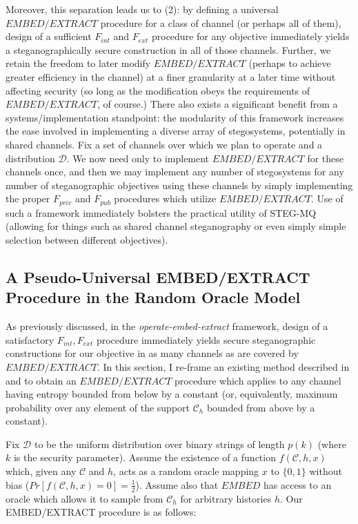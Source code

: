 \documentclass{article}
\begin{document}
Moreover, this separation leads us to (2): by defining a universal $EMBED/EXTRACT$ procedure for a class of channel (or perhaps all of them),
design of a sufficient $F_{int}$ and $F_{ext}$ procedure for any objective immediately yields a steganographically secure construction in all of 
those channels. Further, we retain the freedom to later modify $EMBED/EXTRACT$ (perhaps to achieve greater efficiency in the channel) 
at a finer granularity at a later time without affecting security (so long as the modification obeys the requirements of $EMBED/EXTRACT$, of course.)
\newline\newline
There also exists a significant benefit from a systems/implementation standpoint: the modularity of this framework increases the ease 
involved in implementing a diverse array of stegosystems, potentially in shared channels.  Fix a set of channels over which we plan to operate
and a distribution $\mathcal{D}$.  We now need only to implement $EMBED/EXTRACT$ for these channels once, and then we may implement 
any number of stegosystems for any number of steganographic objectives using these channels by simply implementing the proper $F_{priv}$ and 
$F_{pub}$ procedures which utilize $EMBED/EXTRACT$.  Use of such a framework immediately bolsters the practical utility of STEG-MQ (allowing for 
things such as shared channel steganography or even simply simple selection between different objectives).

\subsection{A Pseudo-Universal EMBED/EXTRACT Procedure in the Random Oracle Model}

As previously discussed, in the \textit{operate-embed-extract} framework,
design of a satisfactory $F_{int},F_{ext}$ procedure immediately yields secure steganographic constructions for our objective 
in as many channels as are covered by $EMBED/EXTRACT$.  In this section, I re-frame an existing method described in \cite{BiglouPubKey} 
and \cite{BiglouPSS} to obtain an $EMBED/EXTRACT$ procedure which applies to any channel having entropy bounded from below by a constant 
(or, equivalently, maximum probability over any element of the support $\mathcal{C}_h$ bounded from above by a constant).

Fix $\mathcal{D}$ to be the uniform distribution over binary strings of length $p(k)$ (where $k$ is the security parameter).  Assume the existence
of a function $f(\mathcal{C},h,x)$ which, given any $\mathcal{C}$ and $h$, acts as a random oracle mapping $x$ to $\{0,1\}$ without bias 
($Pr[f(\mathcal{C},h,x) = 0] = \frac{1}{2}$).  Assume also that $EMBED$ has access to an oracle which allows it to sample from 
$\mathcal{C}_h$ for arbitrary histories $h$.  Our EMBED/EXTRACT procedure is as follows:
\end{document}
